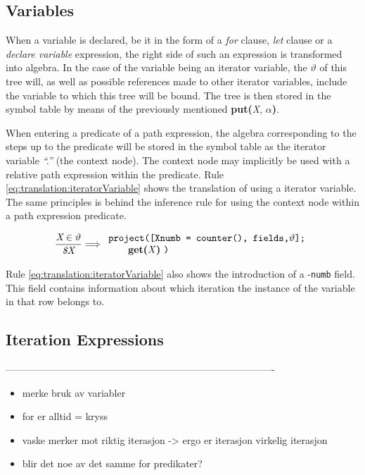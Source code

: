 \subsection{Variables}
\label{sect:translation:variables}
When a variable is declared, be it in the form of a \textit{for} clause,
\textit{let} clause or a \textit{declare variable} expression, the right side
of such an expression is transformed into algebra. In the case of the
variable being an iterator variable, the $\vartheta$ of this tree will, as well
as possible references made to other iterator variables, include the variable
to which this tree will be bound. The tree is then stored in the symbol
table by means of the previously mentioned \textbf{put(}\textit{X},
$\alpha$\textbf{)}.

When entering a predicate of a path expression, the algebra corresponding to
the steps up to the predicate will be stored in the symbol table as the
iterator variable \textit{``.''} (the context node). The context node may
implicitly be used with a relative path expression within the predicate. Rule
\ref{eq:translation:iteratorVariable} shows the translation of using a
iterator variable. The same principles is behind the inference rule for using
the context node within a path expression predicate.

\begin{equation}
\centering
\frac{\displaystyle \textit{X} \in \vartheta}{\displaystyle \textit{\$X}}
\Longrightarrow
\begin{array}{l}
	\mbox{\texttt{project([Xnumb = counter(), fields,}} \vartheta
	\mbox{\texttt{];}}
	\\ \qquad
	\mbox{\textbf{get(}\textit{X}\textbf{)} \texttt{)}}
\end{array}
\label{eq:translation:iteratorVariable}
\end{equation}

Rule \ref{eq:translation:iteratorVariable} also shows the introduction of a
-\verb!numb! field. This field contains information about which iteration the
instance of the variable in that row belongs to.


\subsection{Iteration Expressions}
\label{sect:translation:iteration}



----------------------------------------------------------------------------------
\label{sect:method:madslifting}
\begin{itemize}
\item merke bruk av variabler
\item for er alltid = kryss
\item vaske merker mot riktig iterasjon -> ergo er iterasjon virkelig iterasjon
\item blir det noe av det samme for predikater?
\end{itemize}